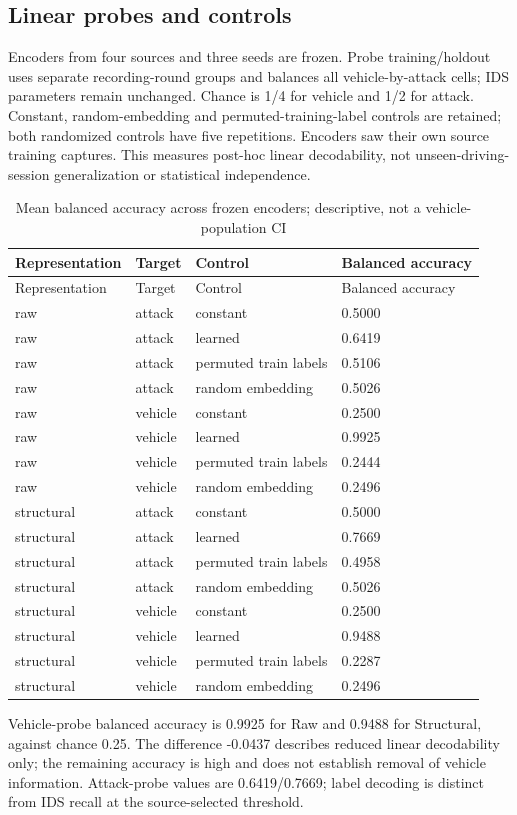 \documentclass[12pt,a4paper,oneside,openany]{extbook}
\begin{document}
\subsection{Linear probes and controls}
Encoders from four sources and three seeds are frozen. Probe training/holdout uses separate recording-round groups and balances all vehicle-by-attack cells; IDS parameters remain unchanged. Chance is 1/4 for vehicle and 1/2 for attack. Constant, random-embedding and permuted-training-label controls are retained; both randomized controls have five repetitions. Encoders saw their own source training captures. This measures post-hoc linear decodability, not unseen-driving-session generalization or statistical independence.
\begin{longtable}{P{3.3cm}P{1.6cm}P{4.7cm}P{3.1cm}}
\caption{Mean balanced accuracy across frozen encoders; descriptive, not a vehicle-population CI}\label{tab:extension-probes}\\\toprule
Representation & Target & Control & Balanced accuracy\\\midrule\endfirsthead
\toprule
Representation & Target & Control & Balanced accuracy\\\midrule\endhead
raw & attack & constant & 0.5000\\
raw & attack & learned & 0.6419\\
raw & attack & permuted train labels & 0.5106\\
raw & attack & random embedding & 0.5026\\
raw & vehicle & constant & 0.2500\\
raw & vehicle & learned & 0.9925\\
raw & vehicle & permuted train labels & 0.2444\\
raw & vehicle & random embedding & 0.2496\\
structural & attack & constant & 0.5000\\
structural & attack & learned & 0.7669\\
structural & attack & permuted train labels & 0.4958\\
structural & attack & random embedding & 0.5026\\
structural & vehicle & constant & 0.2500\\
structural & vehicle & learned & 0.9488\\
structural & vehicle & permuted train labels & 0.2287\\
structural & vehicle & random embedding & 0.2496\\
\bottomrule\end{longtable}
Vehicle-probe balanced accuracy is 0.9925 for Raw and 0.9488 for Structural, against chance 0.25. The difference -0.0437 describes reduced linear decodability only; the remaining accuracy is high and does not establish removal of vehicle information. Attack-probe values are 0.6419/0.7669; label decoding is distinct from IDS recall at the source-selected threshold.
\end{document}
